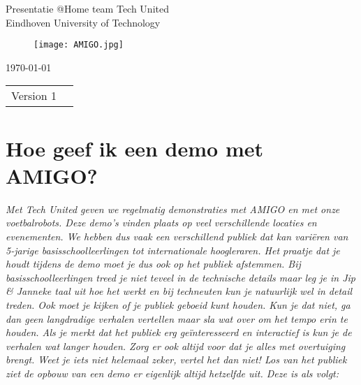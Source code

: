 \documentclass[a4paper,10pt]{article}
\numberwithin{equation}{section}
\numberwithin{figure}{section}
\numberwithin{table}{section}
\begin{document}
\begin{titlepage}

\begin{center}
\vspace{15mm}
\end{center}

\begin{figure}[H]
\centering
\end{figure}

\begin{center}
\vspace{10mm}
{\Huge Presentatie @Home team Tech United}\\
\vspace{3mm}
{\Large Eindhoven University of Technology}\\
\vspace{10mm}
\vspace{3mm}
\begin{figure}[H]
\center
\texttt{[image: AMIGO.jpg]}
\end{figure}
\today
\end{center}

\vfill


\begin{tabular}{l l}
Version 1\\
\end{tabular}

\end{titlepage}

\section*{Hoe geef ik een demo met AMIGO?}
\textit{Met Tech United geven we regelmatig demonstraties met AMIGO en met onze voetbalrobots. Deze demo’s vinden plaats op veel verschillende locaties en evenementen. We hebben dus vaak een verschillend publiek dat kan variëren van 5-jarige basisschoolleerlingen tot internationale hoogleraren. Het praatje dat je houdt tijdens de demo moet je dus ook op het publiek afstemmen. Bij basisschoolleerlingen treed je niet teveel in de technische details maar leg je in Jip \& Janneke taal uit hoe het werkt en bij techneuten kun je natuurlijk wel in detail treden. Ook moet je kijken of je publiek geboeid kunt houden. Kun je dat niet, ga dan geen langdradige verhalen vertellen maar sla wat over om het tempo erin te houden. Als je merkt dat het publiek erg geïnteresseerd en interactief is kun je de verhalen wat langer houden. Zorg er ook altijd voor dat je alles met overtuiging brengt. Weet je iets niet helemaal zeker, vertel het dan niet! Los van het publiek ziet de opbouw van een demo er eigenlijk altijd hetzelfde uit. Deze is als volgt:}
\end{document}
